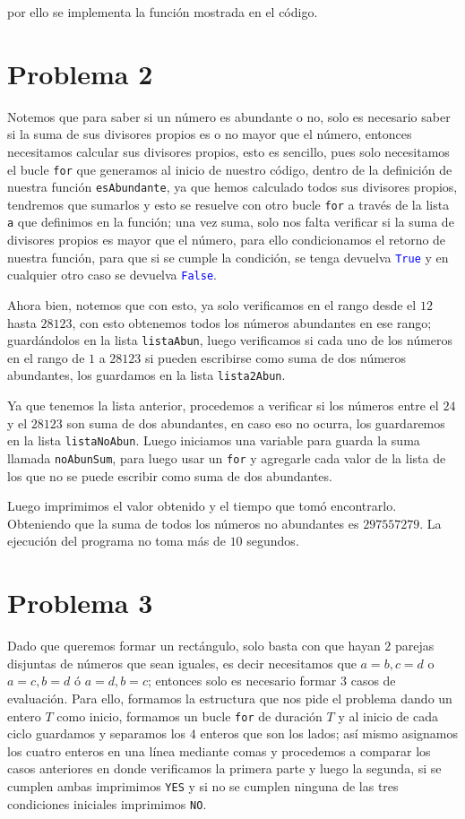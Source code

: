 	por ello se implementa la función mostrada en el código.
	
	
	\section{Problema 2}
	
	Notemos que para saber si un número es abundante o no, solo es necesario saber si la suma de sus divisores propios es o no mayor que el número, entonces necesitamos calcular sus divisores propios, esto es sencillo, pues solo necesitamos el bucle \texttt{for} que generamos al inicio de nuestro código, dentro de la definición de nuestra función \texttt{esAbundante}, ya que hemos calculado todos sus divisores propios, tendremos que  sumarlos y esto se resuelve con otro bucle \texttt{for} a través de la lista \texttt{a} que definimos en la función; una vez suma, solo nos falta verificar si la suma de divisores propios es mayor que el número, para ello condicionamos el retorno de nuestra función, para que si se cumple la condición, se tenga devuelva \textcolor{blue}{\texttt{True}} y en cualquier otro caso se devuelva \textcolor{blue}{\texttt{False}}.
	
	Ahora bien, notemos que con esto, ya solo verificamos en el rango desde el \(12\) hasta \(28123\), con esto obtenemos todos los números abundantes en ese rango; guardándolos en la lista \texttt{listaAbun}, luego verificamos si cada uno de los números en el rango de \(1\) a \(28123\) si pueden escribirse como suma de dos números abundantes, los guardamos en la lista \texttt{lista2Abun}.
	
	Ya que tenemos la lista anterior, procedemos a verificar si los números entre el \(24\) y el \(28123\) son suma de dos abundantes, en caso eso no ocurra, los guardaremos en la lista \texttt{listaNoAbun}. Luego iniciamos una variable para guarda la suma llamada \texttt{noAbunSum}, para luego usar un \texttt{for} y agregarle cada valor de la lista de los que no se puede escribir como suma de dos abundantes.
	
	Luego imprimimos el valor obtenido y el tiempo que tomó encontrarlo. Obteniendo que la suma de todos los números no abundantes es \(297557279\). La ejecución del programa no toma más de \(10\) segundos.
	
	\section{Problema 3}
	
	Dado que queremos formar un rectángulo, solo basta con que hayan \(2\) parejas disjuntas de números que sean iguales, es decir necesitamos que \(a=b, c=d\) o \(a=c, b=d\) ó \(a=d, b=c\); entonces solo es necesario formar \(3\) casos de evaluación. Para ello, formamos la estructura que nos pide el problema dando un entero \(T\) como inicio, formamos un bucle \texttt{for} de duración \(T\) y al inicio de cada ciclo guardamos y separamos los \(4\) enteros que son los lados; así mismo asignamos los cuatro enteros en una línea mediante comas y procedemos a comparar los casos anteriores en donde verificamos la primera parte y luego la segunda, si se cumplen ambas imprimimos \texttt{YES} y si no se cumplen ninguna de las tres condiciones iniciales imprimimos \texttt{NO}.
	
